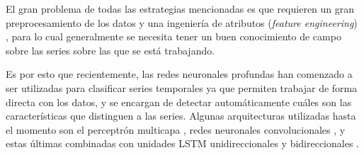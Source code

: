 \documentclass[../../main.tex]{subfiles}
\begin{document}
El gran problema de todas las estrategias mencionadas es que requieren un gran
preprocesamiento de los datos y una ingeniería de atributos (\textit{feature engineering})
\cite{wang2016timeseriesclassificationscratch}, para lo cual generalmente se necesita
tener un buen conocimiento de campo sobre las series sobre las que se está trabajando.

Es por esto que recientemente, las redes neuronales profundas han comenzado a ser
utilizadas para clasificar series temporales
\cite{wang2016timeseriesclassificationscratch} ya que permiten trabajar de forma directa
con los datos, y se encargan de detectar automáticamente cuáles son las características
que distinguen a las series. Algunas arquitecturas utilizadas hasta el momento son el
perceptrón multicapa \cite{wang2016timeseriesclassificationscratch}, redes neuronales
convolucionales \cite{wang2016timeseriesclassificationscratch}, y estas últimas combinadas
con unidades LSTM unidireccionales \cite{Karim_2018} y bidireccionales
\cite{khan2021-bilstm-for-unitsc}.
\end{document}
